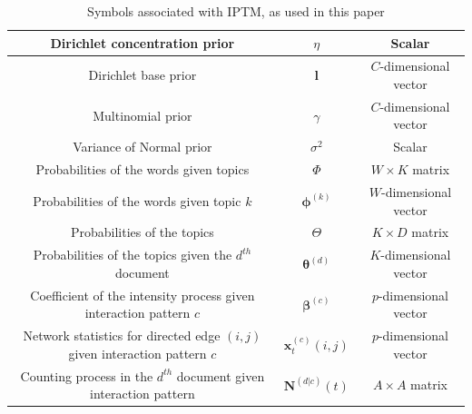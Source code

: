 \documentclass[a4paper]{article}
\begin{document}
\begin{table}[ht]
{\begin{tabular}{ |c|c|c|}
  								\hline				 	
  									Dirichlet concentration prior&$\eta$ & Scalar \\
  									\hline		
  										Dirichlet base prior&$\boldsymbol{l}$ & $C$-dimensional vector  \\
  										\hline			
  				Multinomial prior&$\gamma$ & $C$-dimensional vector \\
  				\hline
  				Variance of Normal prior&$\sigma^2$ & Scalar \\
  				\hline		
  					Probabilities of the words given topics &$\Phi$ & $W \times K$ matrix \\
  					\hline		
  						Probabilities of the words given topic $k$ &$\boldsymbol{\phi}^{(k)}$ & $W$-dimensional vector\\
  						\hline
  							Probabilities of the topics &$\Theta$ & $K \times D$ matrix \\
  							\hline		
  							Probabilities of the topics given the $d^{th}$ document &$\boldsymbol{\theta}^{(d)}$ & $K$-dimensional vector\\
  						\hline		
  						Coefficient of the intensity process given interaction pattern $c$ &$\boldsymbol{\beta}^{(c)}$ & $p$-dimensional vector\\
  							\hline		
  					Network statistics for directed edge $(i, j)$ given interaction pattern $c$ &$\boldsymbol{x}^{(c)}_t{(i,j)}$ & $p$-dimensional vector\\
  						\hline		
  				Counting process in the $d^{th}$ document given interaction pattern &	$\mathbf{N}^{(d|c)}(t)$ & $A\times A$ matrix\\
  						\hline
  						\hline
 	\end{tabular}}
 	\caption {Symbols associated with IPTM, as used in this paper}
 	\label{table:SymbolsIPTM}
 \end{table}
\normalsize
\clearpage
\end{document}
